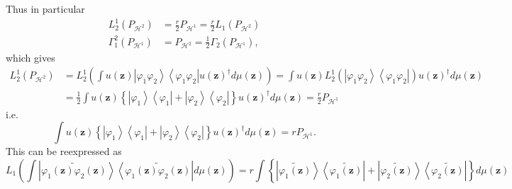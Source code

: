 \documentclass[aps,preprint]{revtex4}%
\begin{document}
Thus in particular
\begin{align}
L_{2}^{1}\left(  P_{\mathcal{H}^{2}}\right)   &  =\frac{r}{2}P_{\mathcal{H}%
^{1}}=\frac{r}{2}L_{1}\left(  P_{\mathcal{H}^{2}}\right) \nonumber\\
\Gamma_{1}^{2}\left(  P_{\mathcal{H}^{1}}\right)   &  =P_{\mathcal{H}^{2}%
}=\frac{1}{2}\Gamma_{2}\left(  P_{\mathcal{H}^{1}}\right)  ,
\end{align}
which gives%
\begin{align}
L_{2}^{1}\left(  P_{\mathcal{H}^{2}}\right)   &  =L_{2}^{1}\left(  \int
u\left(  \mathbf{z}\right)  \left\vert \varphi_{1}\varphi_{2}\right\rangle
\left\langle \varphi_{1}\varphi_{2}\right\vert u\left(  \mathbf{z}\right)
^{\dagger}d\mu\left(  \mathbf{z}\right)  \right)  =\int u\left(
\mathbf{z}\right)  L_{2}^{1}\left(  \left\vert \varphi_{1}\varphi
_{2}\right\rangle \left\langle \varphi_{1}\varphi_{2}\right\vert \right)
u\left(  \mathbf{z}\right)  ^{\dagger}d\mu\left(  \mathbf{z}\right)
\nonumber\\
&  =\frac{1}{2}\int u\left(  \mathbf{z}\right)  \left\{  \left\vert
\varphi_{1}\right\rangle \left\langle \varphi_{1}\right\vert +\left\vert
\varphi_{2}\right\rangle \left\langle \varphi_{2}\right\vert \right\}
u\left(  \mathbf{z}\right)  ^{\dagger}d\mu\left(  \mathbf{z}\right)  =\frac
{r}{2}P_{\mathcal{H}^{1}}%
\end{align}
i.e.%
\begin{equation}
\int u\left(  \mathbf{z}\right)  \left\{  \left\vert \varphi_{1}\right\rangle
\left\langle \varphi_{1}\right\vert +\left\vert \varphi_{2}\right\rangle
\left\langle \varphi_{2}\right\vert \right\}  u\left(  \mathbf{z}\right)
^{\dagger}d\mu\left(  \mathbf{z}\right)  =rP_{\mathcal{H}^{1}}.
\end{equation}
This can be reexpressed as
\begin{equation}
L_{1}\left(  \int\left\vert \widetilde{\varphi_{1}\left(  \mathbf{z}\right)
\varphi_{2}\left(  \mathbf{z}\right)  }\right\rangle \left\langle
\widetilde{\varphi_{1}\left(  \mathbf{z}\right)  \varphi_{2}\left(
\mathbf{z}\right)  }\right\vert d\mu\left(  \mathbf{z}\right)  \right)
=r\int\left\{  \left\vert \widetilde{\varphi_{1}\left(  \mathbf{z}\right)
}\right\rangle \left\langle \widetilde{\varphi_{1}\left(  \mathbf{z}\right)
}\right\vert +\left\vert \widetilde{\varphi_{2}\left(  \mathbf{z}\right)
}\right\rangle \left\langle \widetilde{\varphi_{2}\left(  \mathbf{z}\right)
}\right\vert \right\}  d\mu\left(  \mathbf{z}\right)
\end{equation}
\end{document}
